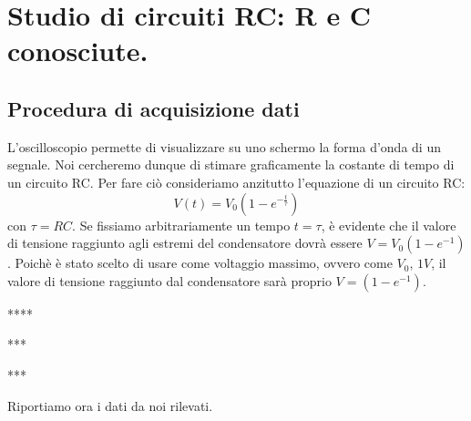 \section{Studio di circuiti RC: R e C conosciute.}
\subsection{Procedura di acquisizione dati}
L'oscilloscopio permette di visualizzare su uno schermo la forma d'onda di un segnale. Noi cercheremo dunque di stimare graficamente la costante di tempo di un circuito RC. Per fare ciò consideriamo anzitutto l'equazione di un circuito RC:
\begin{equation}
V(t)=V_0(1-e^{-\frac{t}{\tau}})
\label{RC}
\end{equation}
con $\tau=RC$. Se fissiamo arbitrariamente un tempo $t=\tau$, è evidente che il valore di tensione raggiunto agli estremi del condensatore dovrà essere $V=V_0(1-e^{-1})$. Poichè è stato scelto di usare come voltaggio massimo, ovvero come $V_0$, $1V$, il valore di tensione raggiunto dal condensatore sarà proprio $V=(1-e^{-1})$. 

****

***

***


Riportiamo ora i dati da noi rilevati.

